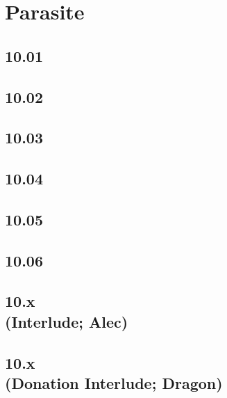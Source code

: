 \part{Parasite}

 \chapter{10.01}

 \chapter{10.02}

 \chapter{10.03}

 \chapter{10.04}

 \chapter{10.05}

 \chapter{10.06}

 \chapter[10.x (Interlude; Alec)]{10.x\\(Interlude; Alec)}

 \chapter[10.x (Donation Interlude; Dragon)]{10.x\\(Donation Interlude; Dragon)}









